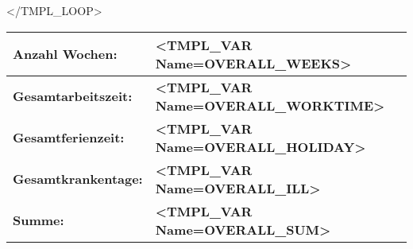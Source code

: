 \documentclass[11pt]{report}
\begin{document}
</TMPL_LOOP>

\begin{tabular}{|p{14.3cm}|p{2cm}|}
	\hline
	\textbf{Anzahl Wochen:} & 
	\textbf{<TMPL_VAR Name=OVERALL_WEEKS> } \\
	\hline
	\textbf{Gesamtarbeitszeit:} & 
	\textbf{<TMPL_VAR Name=OVERALL_WORKTIME> } \\
	\hline
	\textbf{Gesamtferienzeit:} & 
	\textbf{<TMPL_VAR Name=OVERALL_HOLIDAY> } \\
	\hline
	\textbf{Gesamtkrankentage:} & 
	\textbf{<TMPL_VAR Name=OVERALL_ILL> } \\
	\hline	
        \textbf{Summe:} & 
	\textbf{<TMPL_VAR Name=OVERALL_SUM> } \\
	\hline
\end{tabular}
\end{document}
